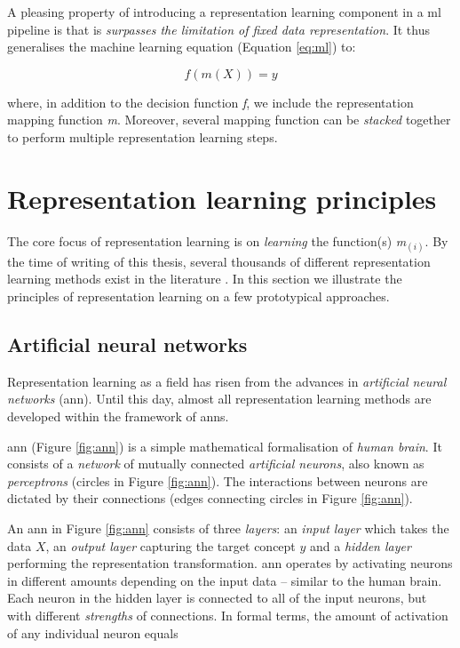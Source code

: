 A pleasing property of introducing a representation learning component in a \gls{ml} pipeline is that is \textit{surpasses the limitation of fixed data representation}.
It thus generalises the machine learning equation (Equation \ref{eq:ml}) to:

\begin{equation}
	f(m(X)) = y
\end{equation}


where, in addition to the decision function \textit{f}, we include the representation mapping function \textit{m}.
Moreover, several mapping function can be \textit{stacked} together to perform multiple representation learning steps.







\section{Representation learning principles}


The core focus of representation learning is on \textit{learning} the function(s) \textit{m}$_{(i)}$.
By the time of writing of this thesis, several thousands of different representation learning methods exist in the literature \cite{Goodfellow2016}.
In this section we illustrate the principles of representation learning on a few prototypical approaches.


\subsection{Artificial neural networks}



Representation learning as a field has risen from the advances in \textit{artificial neural networks} (\gls{ann}).
Until this day, almost all representation learning methods are developed within the framework of \gls{ann}s.


\gls{ann} (Figure \ref{fig:ann}) is a simple mathematical formalisation of \textit{human brain}.
It consists of a \textit{network} of mutually connected \textit{artificial neurons}, also known as \textit{perceptrons} (circles in Figure \ref{fig:ann}).
The interactions between neurons are dictated by their connections (edges connecting circles in Figure \ref{fig:ann}).


An \gls{ann} in Figure \ref{fig:ann} consists of three \textit{layers}: an \textit{input layer} which takes the data $X$, an \textit{output layer} capturing the target concept $y$ and a \textit{hidden layer} performing the representation transformation.
\gls{ann} operates by activating neurons in different amounts depending on the input data -- similar to the human brain.
Each neuron in the hidden layer is connected to all of the input neurons, but with different \textit{strengths} of connections.
In formal terms, the amount of activation of any individual neuron equals

